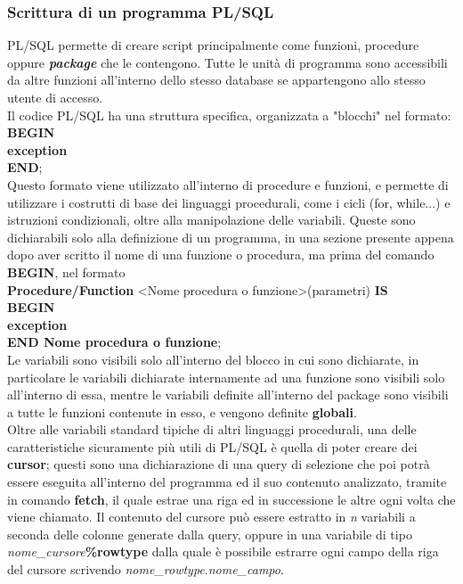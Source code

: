 \subsubsection{Scrittura di un programma PL/SQL}
PL/SQL permette di creare script principalmente come funzioni, procedure oppure \textbf{\textit{package}} che le contengono. Tutte le unità di programma sono accessibili da altre funzioni all'interno dello stesso database se appartengono allo stesso utente di accesso.\\
Il codice PL/SQL ha una struttura specifica, organizzata a "blocchi" nel formato:\\ \textbf{BEGIN}\newline [content] \\ \textbf{exception}\\ \textbf{END};\\ Questo formato viene utilizzato all'interno di procedure e funzioni, e permette di utilizzare i costrutti di base dei linguaggi procedurali, come i cicli (for, while...) e istruzioni condizionali, oltre alla manipolazione delle variabili. Queste sono dichiarabili solo alla definizione di un programma, in una sezione presente appena dopo aver scritto il nome di una funzione o procedura, ma prima del comando \textbf{BEGIN}, nel formato\\ \textbf{Procedure/Function} <Nome procedura o funzione>(parametri) \textbf{IS}\\ \textbf{BEGIN}\newline [content]\\ \textbf{exception}\\ \textbf{END Nome procedura o funzione};\\Le variabili sono visibili solo all'interno del blocco in cui sono dichiarate, in particolare le variabili dichiarate internamente ad una funzione sono visibili solo all'interno di essa, mentre le variabili definite all'interno del package sono visibili a tutte le funzioni contenute in esso, e vengono definite \textbf{globali}.\\
Oltre alle variabili standard tipiche di altri linguaggi procedurali, una delle caratteristiche sicuramente più utili di PL/SQL è quella di poter creare dei \textbf{cursor}; questi sono una dichiarazione di una query di selezione che poi potrà essere eseguita all'interno del programma ed il suo contenuto analizzato, tramite in comando \textbf{fetch}, il quale estrae una riga ed in successione le altre ogni volta che viene chiamato. Il contenuto del cursore può essere estratto in \textit{n} variabili a seconda delle colonne generate dalla query, oppure in una variabile di tipo \textit{nome\_cursore}\textbf{\%rowtype} dalla quale è possibile estrarre ogni campo della riga del cursore scrivendo \textit{nome\_rowtype}.\textit{nome\_campo}.\\
